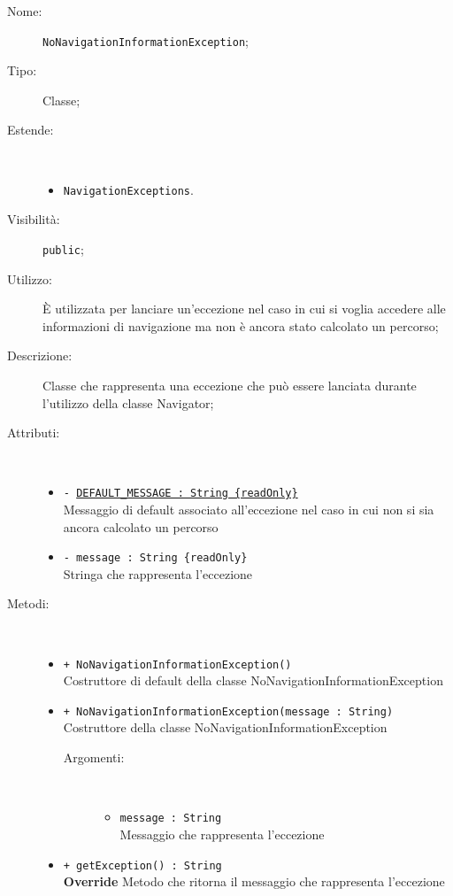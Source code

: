 \documentclass[../DefinizioneDiProdotto.tex]{subfiles}
\begin{document}
\begin{description}
	\item[Nome:] \texttt{NoNavigationInformationException};
	\item[Tipo:] Classe;
	\item[Estende:] \
	\begin{itemize}
		\item \texttt{NavigationExceptions}.
	\end{itemize}
	\item[Visibilità:] \texttt{public};
	\item[Utilizzo:] È utilizzata per lanciare un'eccezione nel caso in cui si voglia accedere alle informazioni di navigazione ma non è ancora stato calcolato un percorso;
	\item[Descrizione:] Classe che rappresenta una eccezione che può essere lanciata durante l'utilizzo della classe Navigator;
	\item[Attributi:] \
	\begin{itemize}
		\item \texttt{- \underline{DEFAULT\_MESSAGE : String \{readOnly\}}}\\
		Messaggio di default associato all'eccezione nel caso in cui non si sia ancora calcolato un percorso
		
		\item \texttt{- message : String \{readOnly\}}\\
		Stringa che rappresenta l'eccezione
		
	\end{itemize}
	\item[Metodi:] \
	\begin{itemize}
		\item \texttt{+ NoNavigationInformationException()}\\
		Costruttore di default della classe NoNavigationInformationException
		\item \texttt{+ NoNavigationInformationException(message : String)}\\
		Costruttore della classe NoNavigationInformationException
		\begin{description}
			\item[Argomenti:] \
			\begin{itemize}
				\item \texttt{message : String}\\
				Messaggio che rappresenta l'eccezione\end{itemize}
		\end{description}
		\item \texttt{+ getException() : String}\\
		\textbf{Override} Metodo che ritorna il messaggio che rappresenta l'eccezione
	\end{itemize}
\end{description}
\end{document}
